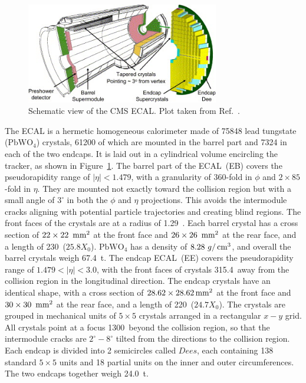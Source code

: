 \begin{figure}[!htb]
    \centering
    \captionsetup{justification=centering}
    \includegraphics[width=0.75\textwidth]{pics/LHC_CMS/ECAL.jpg}
    \caption{Schematic view of the CMS ECAL.
             Plot taken from Ref.~\cite{BROWN200729}.}
    \label{fig:cms_ecal}
\end{figure}

The ECAL is a hermetic homogeneous calorimeter made of 75848 lead tungstate ($\text{PbWO}_{4}$) crystals,
61200 of which are mounted in the barrel part and 7324 in each of the two endcaps.
It is laid out in a cylindrical volume encircling the tracker, as shown in Figure~\ref{fig:cms_ecal}. 
The barrel part of the ECAL~(EB) covers the pseudorapidity range of $|\eta| < 1.479$, 
with a granularity of 360-fold in $\phi$ and $2 \times 85$-fold in $\eta$.
They are mounted not exactly toward the collision region but with a small angle of $3^{\circ}$ in both the $\phi$ and $\eta$ projections.
This avoids the intermodule cracks aligning with potential particle trajectories and creating blind regions.
The front faces of the crystals are at a radius of 1.29~\meter.
Each barrel crystal has a cross section of $22 \times 22~\,\text{mm}^{2}$ at the front face and $26 \times 26~\,\text{mm}^{2}$ at the rear face, and a length of 230~\mm ($25.8 X_{0}$). 
$\text{PbWO}_{4}$ has a density of $8.28~g/\,\text{cm}^{3}$, and overall the barrel crystals weigh 67.4~t.
The endcap ECAL~(EE) covers the pseudorapidity range of $1.479 < |\eta| < 3.0$,
with the front faces of crystals 315.4~\cm away from the collision region in the longitudinal direction. 
The endcap crystals have an identical shape, with a cross section of $28.62 \times 28.62 \,\text{mm}^{2}$ at the front face and $30 \times 30~\,\text{mm}^{2}$ at the rear face, and a length of 220~\mm ($24.7 X_{0}$).
The crystals are grouped in mechanical units of $5 \times 5$ crystals arranged in a rectangular $x-y$ grid.
All crystals point at a focus 1300~\mm beyond the collision region, 
so that the intermodule cracks are $2^{\circ} - 8^{\circ}$ tilted from the directions to the collision region.
Each endcap is divided into 2 semicircles called $Dees$, each containing 138 standard $5 \times 5$ units and 18 partial units on the inner and outer circumferences.
The two endcaps together weigh 24.0~t.

